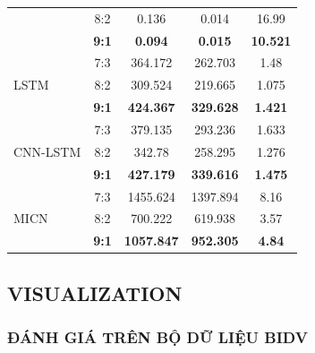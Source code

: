 \documentclass[conference]{IEEEtran}
\begin{document}
\begin{table}[h]
\begin{tabular}{lcccc}
                        & 8:2 & 0.136 & 0.014 & 16.99 \\
                        & \textbf{9:1} & \textbf{0.094} & \textbf{0.015} & \textbf{10.521} \\ \midrule
\multirow{3}{*}{LSTM} & 7:3 & 364.172 & 262.703 & 1.48 \\
                        & 8:2 & 309.524 & 219.665 & 1.075 \\
                        & \textbf{9:1} & \textbf{424.367} & \textbf{329.628} & \textbf{1.421} \\ \midrule
\multirow{3}{*}{CNN-LSTM} & 7:3 & 379.135 & 293.236 & 1.633 \\
                        & 8:2 & 342.78 & 258.295 & 1.276 \\
                        & \textbf{9:1} & \textbf{427.179} & \textbf{339.616} & \textbf{1.475} \\
\multirow{3}{*}{MICN} & 7:3 & 1455.624 & 1397.894 & 8.16 \\
                        & 8:2 & 700.222 & 619.938 & 3.57 \\
                        & \textbf{9:1} & \textbf{1057.847} & \textbf{ 952.305} & \textbf{4.84} \\ \bottomrule
\end{tabular}
\end{table}

\subsection{VISUALIZATION}

\subsubsection{ĐÁNH GIÁ TRÊN BỘ DỮ LIỆU BIDV}
\end{document}
